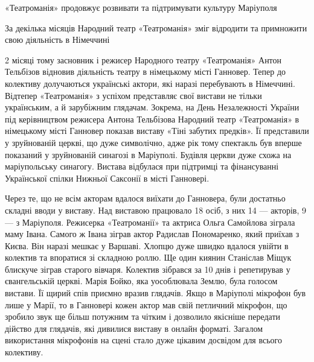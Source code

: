  
 
 
 
 

«Театроманія» продовжує розвивати та підтримувати культуру Маріуполя

За декілька місяців Народний театр «Театроманія» зміг відродити та примножити
свою діяльність в Німеччині

2 місяці тому засновник і режисер Народного театру «Театроманія» Антон
Тельбізов відновив діяльність театру в німецькому місті Ганновер. Тепер до
колективу долучаються українські актори, які наразі перебувають в Німеччині.
Відтепер «Театроманія» з успіхом представляє свої вистави не тільки
українським, а й зарубіжним глядачам. Зокрема, на День Незалежності України під
керівництвом режисера Антона Тельбізова Народний театр «Театроманія» в
німецькому місті Ганновер показав виставу «Тіні забутих предків». Її
представили у зруйнованій церкві, що дуже символічно, адже рік тому спектакль
був вперше показаний у зруйнованій синагозі в Маріуполі. Будівля церкви дуже
схожа на маріупольську синагогу. Вистава відбулася при підтримці та
фінансуванні Української спілки Нижньої Саксонії в місті Ганновері.

Через те, що не всім акторам вдалося виїхати до Ганновера, були достатньо
складні вводи у виставу. Над виставою працювало 18 осіб, з них 14 — акторів, 9
— з Маріуполя. Режисерка «Театроманії» та актриса Ольга Самойлова зіграла маму
Івана. Самого ж Івана зіграв актор Радислав Пономаренко, який приїхав з Києва.
Він наразі мешкає у Варшаві. Хлопцю дуже швидко вдалося увійти в колектив та
впоратися зі складною роллю. Ще один киянин Станіслав Міщук блискуче зіграв
старого вівчаря. Колектив зібрався за 10 днів і репетирував у євангельській
церкві. Марія Бойко, яка уособлювала Землю, була голосом вистави. Її щирий спів
приємно вразив глядачів. Якщо в Маріуполі мікрофон був лише у Марії, то в
Ганновері кожен актор мав свій петличний мікрофон, що зробило звук ще більш
потужним та чітким і дозволило якісніше передати дійство для глядачів, які
дивилися виставу в онлайн форматі. Загалом використання мікрофонів на сцені
стало дуже цікавим досвідом для всього колективу.


